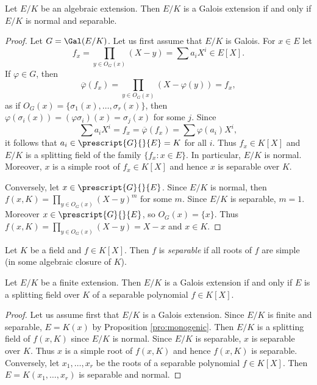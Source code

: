 \begin{proposition}
\label{pro:normal+separable}
    Let $E/K$ be an algebraic extension. Then $E/K$ is a Galois extension
    if and only if $E/K$ is normal and separable. 
\end{proposition}

\begin{proof}
    Let $G=\Gal(E/K)$. Let us first assume that $E/K$ is Galois. For $x\in E$ let 
    \[
    f_x=\prod_{y\in O_G(x)}(X-y)=\sum a_iX^i\in E[X].
    \]
    If $\varphi\in G$, then 
    \[
    \overline{\varphi}(f_x)=\prod_{y\in O_G(x)}(X-\varphi(y))=f_x,
    \]
    as if $O_G(x)=\{\sigma_1(x),\dots,\sigma_r(x)\}$, then 
    $\varphi(\sigma_i(x))=(\varphi\sigma_i)(x)=\sigma_j(x)$ for some $j$. 
    Since 
    \[
    \sum a_iX^i=f_x=\overline{\varphi}(f_x)=\sum\varphi(a_i)X^i,
    \]
    it follows that $a_i\in\prescript{G}{}{E}=K$ for all $i$. 
    Thus $f_x\in K[X]$
    and $E/K$ is a splitting field of the family $\{f_x:x\in E\}$. In particular, 
    $E/K$ is normal. Moreover, $x$ is a simple root of $f_x\in K[X]$ and hence
    $x$ is separable over $K$. 

    Conversely, let $x\in \prescript{G}{}{E}$. Since $E/K$ is normal, then 
    $f(x,K)=\prod_{y\in O_G(x)}(X-y)^m$ for some $m$.
    Since $E/K$ is separable, 
    $m=1$.
    Moreover $x\in \prescript{G}{}{E}$, so $O_G(x)=\{x\}$.
    Thus $f(x,K)=\prod_{y\in O_G(x)}(X-y)=X-x$ and $x\in K$. 
\end{proof}

\begin{definition}
Let $K$ be a field and $f\in K[X]$. Then $f$ is \emph{separable}
if all roots of $f$ are simple (in some algebraic closure of $K$). 
\end{definition}

\begin{proposition}
    Let $E/K$ be a finite extension. Then $E/K$ is a Galois extension 
    if and only if $E$ is a splitting field over $K$ 
    of a separable polynomial $f\in K[X]$. 
\end{proposition}

\begin{proof}
    Let us assume first that $E/K$ is a Galois extension. Since
    $E/K$ is finite and separable, $E=K(x)$ by Proposition \ref{pro:monogenic}. 
    Then $E/K$ is a splitting field of $f(x,K)$ since
    $E/K$ is normal. Since $E/K$ is separable, $x$ is separable over $K$. Thus $x$ is 
    a simple root of $f(x,K)$ and hence $f(x,K)$ is separable. 
    Conversely, let $x_1,\dots,x_r$ be the roots of a separable polynomial $f\in K[X]$.
    Then $E=K(x_1,\dots,x_r)$ is separable and normal.  
\end{proof}

